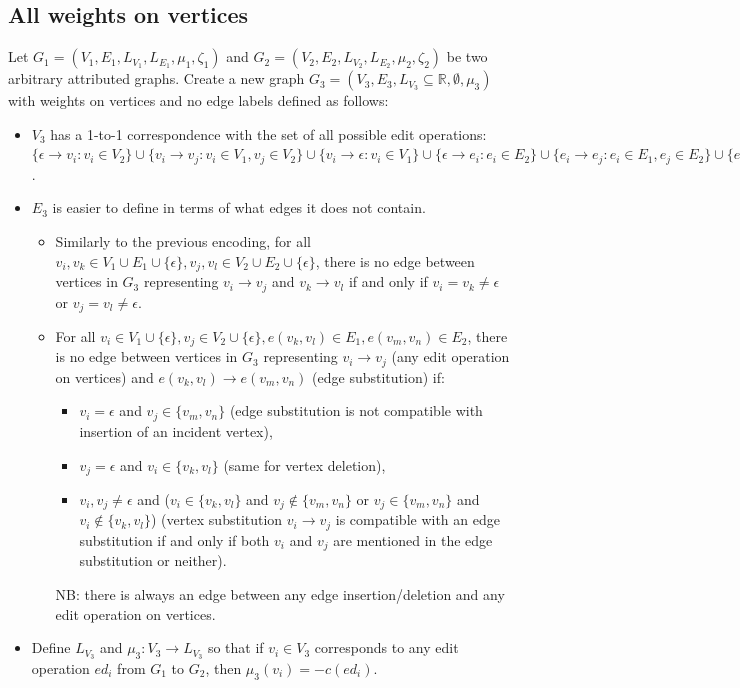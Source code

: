 \documentclass{article}
\theoremstyle{definition}
\begin{document}
\subsection{All weights on vertices}
Let $G_1 = (V_1, E_1, L_{V_1}, L_{E_1}, \mu_1, \zeta_1)$ and $G_2 = (V_2, E_2, L_{V_2}, L_{E_2}, \mu_2, \zeta_2)$ be two arbitrary attributed graphs. Create a new graph $G_3 = (V_3, E_3, L_{V_3} \subseteq \mathbb{R}, \emptyset, \mu_3)$ with weights on vertices and no edge labels defined as follows:
\begin{itemize}
\item $V_3$ has a 1-to-1 correspondence with the set of all possible edit operations: $\{ \epsilon \to v_i : v_i \in V_2 \} \cup \{ v_i \to v_j : v_i \in V_1, v_j \in V_2 \} \cup \{ v_i \to \epsilon : v_i \in V_1 \} \cup \{ \epsilon \to e_i : e_i \in E_2 \} \cup \{ e_i \to e_j : e_i \in E_1, e_j \in E_2 \} \cup \{ e_i \to \epsilon : e_i \in E_1 \}$.
\item  $E_3$ is easier to define in terms of what edges it does not contain.
  \begin{itemize}
  \item Similarly to the previous encoding, for all $v_i, v_k \in V_1 \cup E_1 \cup \{ \epsilon \}, v_j, v_l \in V_2 \cup E_2 \cup \{ \epsilon \}$, there is no edge between vertices in $G_3$ representing $v_i \to v_j$ and $v_k \to v_l$ if and only if $v_i = v_k \ne \epsilon$ or $v_j = v_l \ne \epsilon$.
  \item For all $v_i \in V_1 \cup \{ \epsilon \}, v_j \in V_2 \cup \{ \epsilon \}, e(v_k, v_l) \in E_1, e(v_m, v_n) \in E_2$, there is no edge between vertices in $G_3$ representing $v_i \to v_j$ (any edit operation on vertices) and $e(v_k, v_l) \to e(v_m, v_n)$ (edge substitution) if:
    \begin{itemize}
    \item $v_i = \epsilon$ and $v_j \in \{ v_m, v_n \}$ (edge substitution is not compatible with insertion of an incident vertex),
    \item $v_j = \epsilon$ and $v_i \in \{ v_k, v_l \}$ (same for vertex deletion),
    \item $v_i, v_j \ne \epsilon$ and ($v_i \in \{ v_k, v_l \}$ and $v_j \not \in \{ v_m, v_n \}$ or $v_j \in \{ v_m, v_n \}$ and $v_i \not \in \{ v_k, v_l \}$) (vertex substitution $v_i \to v_j$ is compatible with an edge substitution if and only if both $v_i$ and $v_j$ are mentioned in the edge substitution or neither).
    \end{itemize}
    NB: there is always an edge between any edge insertion/deletion and any edit operation on vertices.
  \end{itemize}
\item Define $L_{V_3}$ and $\mu_3: V_3 \to L_{V_3}$ so that if $v_i \in V_3$ corresponds to any edit operation $ed_i$ from $G_1$ to $G_2$, then $\mu_3(v_i) = -c(ed_i)$.
\end{itemize}
\end{document}
